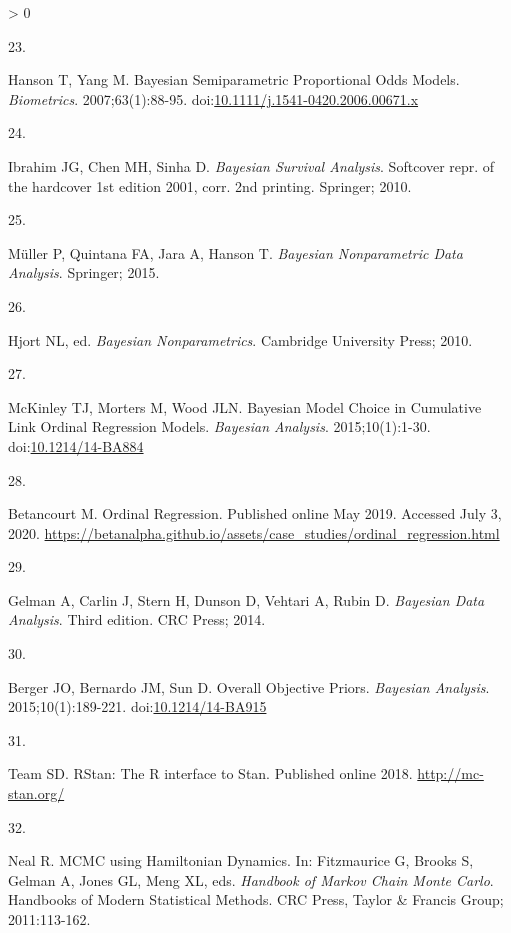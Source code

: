 \documentclass[
]{article}
\newlength{\cslhangindent}
\newlength{\csllabelwidth}
\newenvironment{CSLReferences}[2] %
 {%
  \setlength{\parindent}{0pt}
  \ifodd #1 \everypar{\setlength{\hangindent}{\cslhangindent}}\ignorespaces\fi
  \ifnum #2 > 0
  \setlength{\parskip}{#2\baselineskip}
  \fi
 }%
 {}
\newcommand{\CSLLeftMargin}[1]{\parbox[t]{\csllabelwidth}{#1}}
\newcommand{\CSLRightInline}[1]{\parbox[t]{\linewidth - \csllabelwidth}{#1}\break}
\begin{document}
\begin{CSLReferences}{0}{0}
\leavevmode\hypertarget{ref-hanson_bayesian_2007}{}%
\CSLLeftMargin{23. }
\CSLRightInline{Hanson T, Yang M. Bayesian {Semiparametric} {Proportional} {Odds} {Models}. \emph{Biometrics}. 2007;63(1):88-95. doi:\href{https://doi.org/10.1111/j.1541-0420.2006.00671.x}{10.1111/j.1541-0420.2006.00671.x}}

\leavevmode\hypertarget{ref-ibrahim_bayesian_2010}{}%
\CSLLeftMargin{24. }
\CSLRightInline{Ibrahim JG, Chen MH, Sinha D. \emph{Bayesian Survival Analysis}. Softcover repr. of the hardcover 1st edition 2001, corr. 2nd printing. Springer; 2010.}

\leavevmode\hypertarget{ref-muller_bayesian_2015}{}%
\CSLLeftMargin{25. }
\CSLRightInline{Müller P, Quintana FA, Jara A, Hanson T. \emph{Bayesian Nonparametric Data Analysis}. Springer; 2015.}

\leavevmode\hypertarget{ref-hjort_bayesian_2010}{}%
\CSLLeftMargin{26. }
\CSLRightInline{Hjort NL, ed. \emph{Bayesian Nonparametrics}. Cambridge University Press; 2010.}

\leavevmode\hypertarget{ref-mckinley_bayesian_2015}{}%
\CSLLeftMargin{27. }
\CSLRightInline{McKinley TJ, Morters M, Wood JLN. Bayesian {Model} {Choice} in {Cumulative} {Link} {Ordinal} {Regression} {Models}. \emph{Bayesian Analysis}. 2015;10(1):1-30. doi:\href{https://doi.org/10.1214/14-BA884}{10.1214/14-BA884}}

\leavevmode\hypertarget{ref-betancourt_ordinal_2019}{}%
\CSLLeftMargin{28. }
\CSLRightInline{Betancourt M. Ordinal {Regression}. Published online May 2019. Accessed July 3, 2020. \url{https://betanalpha.github.io/assets/case_studies/ordinal_regression.html}}

\leavevmode\hypertarget{ref-gelman_bayesian_2014}{}%
\CSLLeftMargin{29. }
\CSLRightInline{Gelman A, Carlin J, Stern H, Dunson D, Vehtari A, Rubin D. \emph{Bayesian {Data} {Analysis}}. Third edition. CRC Press; 2014.}

\leavevmode\hypertarget{ref-berger_overall_2015}{}%
\CSLLeftMargin{30. }
\CSLRightInline{Berger JO, Bernardo JM, Sun D. Overall {Objective} {Priors}. \emph{Bayesian Analysis}. 2015;10(1):189-221. doi:\href{https://doi.org/10.1214/14-BA915}{10.1214/14-BA915}}

\leavevmode\hypertarget{ref-stan_development_team_rstan:_2018}{}%
\CSLLeftMargin{31. }
\CSLRightInline{Team SD. {RStan}: The {R} interface to {Stan}. Published online 2018. \url{http://mc-stan.org/}}

\leavevmode\hypertarget{ref-neal_mcmc_2011}{}%
\CSLLeftMargin{32. }
\CSLRightInline{Neal R. {MCMC} using {Hamiltonian} {Dynamics}. In: Fitzmaurice G, Brooks S, Gelman A, Jones GL, Meng XL, eds. \emph{Handbook of {Markov} {Chain} {Monte} {Carlo}}. Handbooks of {Modern} {Statistical} {Methods}. CRC Press, Taylor \& Francis Group; 2011:113-162.}


\end{CSLReferences}
\end{document}
